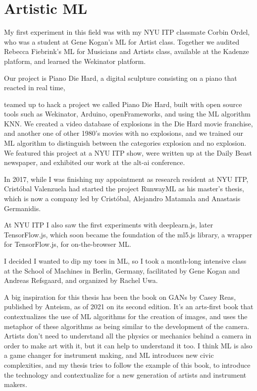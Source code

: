 \section{Artistic ML}

My first experiment in this field was with my \acrshort{NYU} \acrshort{ITP} classmate Corbin Ordel, who was a student at Gene Kogan's \acrshort{ML} for Artist class. Together we audited Rebecca Fiebrink's \acrshort{ML} for Musicians and Artists class, available at the Kadenze platform, and learned the Wekinator platform.

Our project is Piano Die Hard, a digital sculpture consisting on a piano that reacted in real time, 


teamed up to hack a project we called Piano Die Hard, built with open source tools such as Wekinator, Arduino, openFrameworks, and using the \acrshort{ML} algorithm KNN. We created a video database of explosions in the Die Hard movie franchise, and another one of other 1980's movies with no explosions, and we trained our \acrshort{ML} algorithm to distinguish between the categories explosion and no explosion. We featured this project at a \acrshort{NYU} \acrshort{ITP} show, were written up at the Daily Beast newspaper, and exhibited our work at the alt-ai conference.

In 2017, while I was finishing my appointment as research resident at \acrshort{NYU} ITP, Cristóbal Valenzuela had started the project RunwayML as his master's thesis, which is now a company led by Cristóbal, Alejandro Matamala and Anastasis Germanidis.

At \acrshort{NYU} \acrshort{ITP} I also saw the first experiments with deeplearn.js, later TensorFlow.js, which soon became the foundation of the ml5.js library, a wrapper for TensorFlow.js, for on-the-browser \acrshort{ML}.

I decided I wanted to dip my toes in \acrshort{ML}, so I took a month-long intensive class at the School of Machines in Berlin, Germany, facilitated by Gene Kogan and Andreas Refsgaard, and organized by Rachel Uwa.


A big inspiration for this thesis has been the book on GANs by Casey Reas, published by Anteism, as of 2021 on its second edition. It’s an arts-first book that contextualizes the use of \acrshort{ML} algorithms for the creation of images, and uses the metaphor of these algorithms as being similar to the development of the camera. Artists don’t need to understand all the physics or mechanics behind a camera in order to make art with it, but it can help to understand it too. I think \acrshort{ML} is also a game changer for instrument making, and \acrshort{ML} introduces new civic complexities, and my thesis tries to follow the example of this book, to introduce the technology and contextualize for a new generation of artists and instrument makers.

